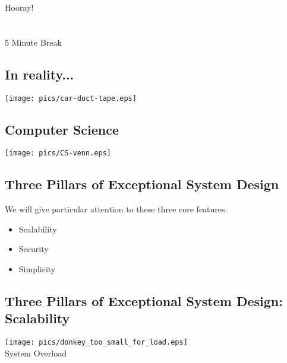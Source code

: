 \documentclass[xga]{xdvislides}
\begin{document}
\newpage
\vspace*{\fill}
\begin{center}
    \Hugesize
        Hooray! \\ [1em]
    \hspace*{5mm}
    \blueline\\
    \hspace*{5mm}\\
        5 Minute Break
\end{center}
\vspace*{\fill}

\subsection{In reality...}
\vspace*{\fill}
\begin{center}
    \texttt{[image: pics/car-duct-tape.eps]}
\end{center}
\vspace*{\fill}

\subsection{Computer Science}
\vspace*{\fill}
\begin{center}
	\texttt{[image: pics/CS-venn.eps]}
\Normalsize
\end{center}
\vspace*{\fill}

\subsection{Three Pillars of Exceptional System Design}
We will give particular attention to these three core features:
\begin{itemize}
	\item Scalability
	\item Security
	\item Simplicity
\end{itemize}

\subsection{Three Pillars of Exceptional System Design: Scalability}
\vspace*{\fill}
\begin{center}
    \texttt{[image: pics/donkey\_too\_small\_for\_load.eps]} \\
	System Overload
\end{center}
\vspace*{\fill}
\end{document}
